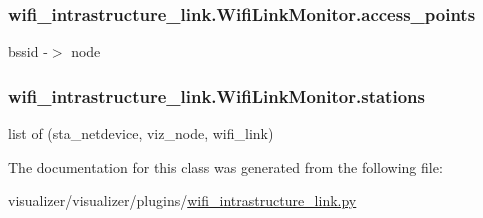 \subsubsection[{\texorpdfstring{access\+\_\+points}{access_points}}]{\setlength{\rightskip}{0pt plus 5cm}wifi\+\_\+intrastructure\+\_\+link.\+Wifi\+Link\+Monitor.\+access\+\_\+points}\hypertarget{classwifi__intrastructure__link_1_1WifiLinkMonitor_a88bcca8c63ba545b2146e6115974d3a8}{}\label{classwifi__intrastructure__link_1_1WifiLinkMonitor_a88bcca8c63ba545b2146e6115974d3a8}


bssid -\/$>$ node 

\subsubsection[{\texorpdfstring{stations}{stations}}]{\setlength{\rightskip}{0pt plus 5cm}wifi\+\_\+intrastructure\+\_\+link.\+Wifi\+Link\+Monitor.\+stations}\hypertarget{classwifi__intrastructure__link_1_1WifiLinkMonitor_ac637392889dae17ecc8f8e5cc31e82e0}{}\label{classwifi__intrastructure__link_1_1WifiLinkMonitor_ac637392889dae17ecc8f8e5cc31e82e0}


list of (sta\+\_\+netdevice, viz\+\_\+node, wifi\+\_\+link) 



The documentation for this class was generated from the following file\+:\begin{DoxyCompactItemize}
\item 
visualizer/visualizer/plugins/\hyperlink{wifi__intrastructure__link_8py}{wifi\+\_\+intrastructure\+\_\+link.\+py}\end{DoxyCompactItemize}
